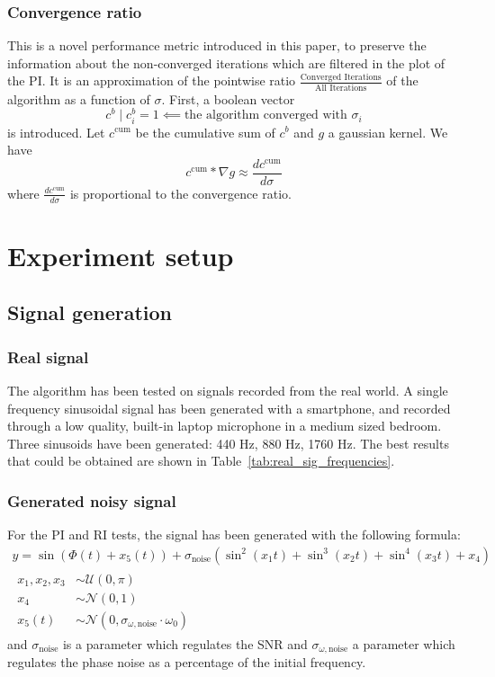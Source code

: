 \documentclass{article}
\begin{document}
\subsubsection{Convergence ratio}
This is a novel performance metric introduced in this paper, to preserve the information about the non-converged iterations which are filtered in the plot of the PI. It is an approximation of the pointwise ratio $\frac{\text{Converged Iterations}}{\text{All Iterations}}$ of the algorithm as a function of $\sigma$. First, a boolean vector $$c^b \mid c^b_i = 1 \impliedby \text{the algorithm converged with } \sigma_i$$ is introduced. Let $c^{\text{cum}}$ be the cumulative sum of $c^b$ and $g$ a gaussian kernel. We have $$c^{\text{cum}} * \nabla g \approx \frac{dc^{\text{cum}}}{d\sigma}$$ where $\frac{dc^{\text{cum}}}{d\sigma}$ is proportional to the convergence ratio.

\section{Experiment setup}
\subsection{Signal generation}
\subsubsection{Real signal}

The algorithm has been tested on signals recorded from the real world. A single frequency sinusoidal signal has been generated with a smartphone, and recorded through a low quality, built-in laptop microphone in a medium sized bedroom. Three sinusoids have been generated: 440 Hz, 880 Hz, 1760 Hz. The best results that could be obtained are shown in Table~\ref{tab:real_sig_frequencies}.

\subsubsection{Generated noisy signal}
For the PI and RI tests, the signal has been generated with the following formula:
\begin{gather*}
y = \sin( \Phi(t) + x_5(t)) + \sigma_\text{noise} \left(  \sin ^2 ( x_1 t ) + \sin ^3 ( x_2 t)  + \sin ^4 ( x_3 t ) + x_4  \right)\\
\begin{aligned}
x_1, x_2, x_3 &\sim \mathcal{U} (0 , \pi )\\
x_4 &\sim\mathcal{N}(0,1)\\
x_5(t) &\sim \mathcal{N}(0,\sigma_{\omega,\text{noise}}\cdot \omega_0)
\end{aligned}
\end{gather*}
and $\sigma_\text{noise}$ is a parameter which regulates the SNR and $\sigma_{\omega,\text{noise}}$ a parameter which regulates the phase noise as a percentage of the initial frequency.
\end{document}

